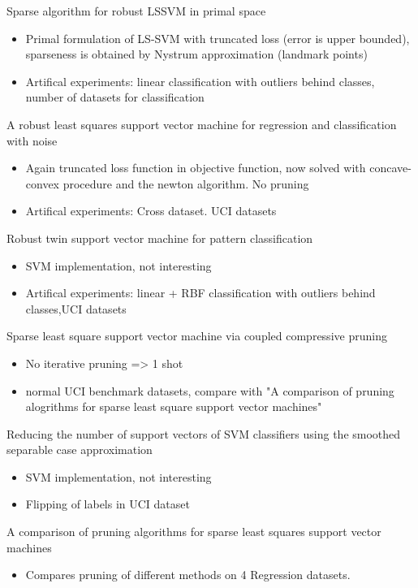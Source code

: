 \documentclass[preprint,12pt]{elsarticle}
\begin{document}
Sparse algorithm for robust LSSVM in primal space~\cite{chen2018sparse}
	\begin{itemize}
		\item Primal formulation of LS-SVM with truncated loss (error is upper bounded), sparseness is obtained by Nystrum approximation (landmark points)
		\item Artifical experiments: linear classification with outliers behind classes, number of datasets for classification 
	\end{itemize}	
A robust least squares support vector machine for regression and classification with noise~\cite{yang2014robust}
	\begin{itemize}
		\item Again truncated loss function in objective function, now solved with concave-convex procedure and the newton algorithm. No pruning
		\item Artifical experiments: Cross dataset. UCI datasets
	\end{itemize}
Robust twin support vector machine for pattern classification~\cite{qi2013robust}
	\begin{itemize}
		\item SVM implementation, not interesting
		\item Artifical experiments: linear + RBF classification with outliers behind classes,UCI datasets
	\end{itemize}
	
Sparse least square support vector machine via coupled compressive pruning~\cite{yang2014sparse}
\begin{itemize}
	\item No iterative pruning => 1 shot
	\item normal UCI benchmark datasets, compare with "A comparison of pruning alogrithms for sparse least square support vector machines"
\end{itemize}

Reducing the number of support vectors of SVM classifiers using the smoothed separable case approximation~\cite{geebelen2012reducing}
\begin{itemize}
	\item SVM implementation, not interesting
	\item Flipping of labels in UCI dataset
\end{itemize}

A comparison of pruning algorithms for sparse least squares support vector machines~\cite{hoegaerts2004comparison}
\begin{itemize}
	\item Compares pruning of different methods on 4 Regression datasets.
\end{itemize}
\end{document}
